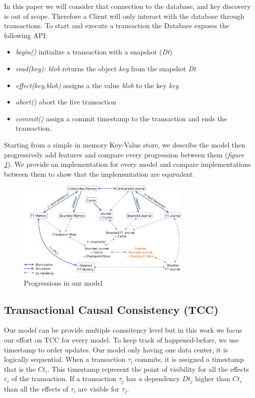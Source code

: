 \documentclass[parallelisme]{compas2022}
\begin{document}
In this paper we will consider that connection to the database, and key discovery is out of scope.
Therefore a Client will only interact with the database through transactions.
To start and execute a transaction the Database exposes the following API:
\begin{itemize}
\item \emph{begin()} initialize a transaction with a snapshot (\emph{Dt})
\item \emph{read(key): blob} returns the object \emph{key} from the snapshot \emph{Dt}
\item \emph{effect(key,blob)} assigns a the value \emph{blob} to the key \emph{key}
\item \emph{abort()} abort the live transaction
\item \emph{commit()} assign a commit timestamp to the transaction and ends the transaction.
\end{itemize}

Starting from a simple in memory Key-Value store, we describe the model then progressively add features and compare every progression between them (\emph{figure \ref{fig:transitions}}).
We provide an implementation for every model and compare implementations between them to show that the implementation are equivalent.

\begin{figure}[tp]
  \centering
  \includegraphics[width=0.75\textwidth]{figures/transitions.png}
  \caption{Progressions in our model}
  \label{fig:transitions}
\end{figure}

\subsection{Transactional Causal Consistency (TCC)}

Our model can be provide multiple conssitency level but in this work we focus our effort on TCC for every model.
To keep track of happened-before, we use timestamp to order updates.
Our model only having one data center, it is logically sequential.
When a transaction $\tau_i$ commits, it is assigned a timestamp that is the $Ct_i$.
This timestamp represent the point of visibility for all the effects $\varepsilon_i$ of the transaction.
If a transaction $\tau_j$ has a dependency $Dt_j$ higher than $Ct_i$ than all the effects of $\tau_i$ are visible for $\tau_j$.
\end{document}
